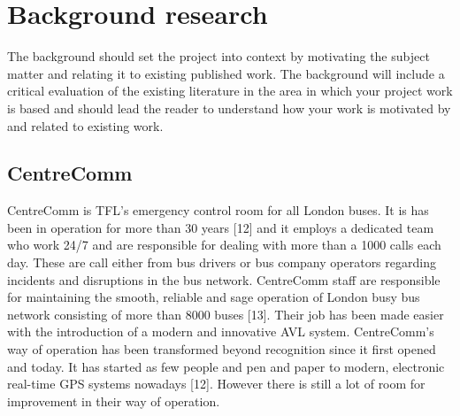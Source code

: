 \chapter{Background research}
The background should set the project into context by motivating the subject matter and relating it to existing published work. The background will include a critical evaluation of the existing literature in the area in which your project work is based and should lead the reader to understand how your work is motivated by and related to existing work.

\section{CentreComm}
	CentreComm is TFL’s emergency control room for all London buses. It is
has been in operation for more than 30 years [12] and it employs a dedicated
team who work 24/7 and are responsible for dealing with more than a 1000
calls each day. These are call either from bus drivers or bus company operators
regarding incidents and disruptions in the bus network. CentreComm
staff are responsible for maintaining the smooth, reliable and sage operation
of London busy bus network consisting of more than 8000 buses [13]. Their
job has been made easier with the introduction of a modern and innovative
AVL system. CentreComm’s way of operation has been transformed beyond recognition since it first opened and today. It has started as few people and
pen and paper to modern, electronic real-time GPS systems nowadays [12].
However there is still a lot of room for improvement in their way of operation.
